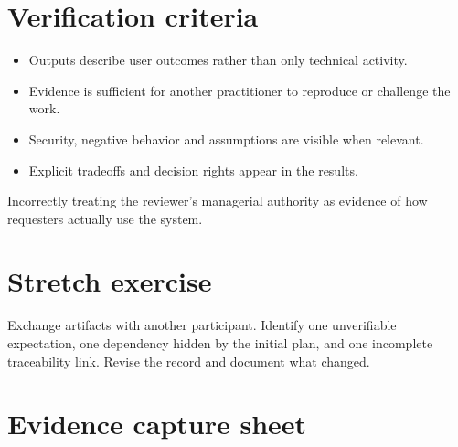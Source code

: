 \documentclass[11pt,letterpaper]{article}
\begin{document}
\section{Verification criteria}
\begin{itemize}[leftmargin=*,itemsep=2pt]
\item Outputs describe user outcomes rather than only technical activity.
\item Evidence is sufficient for another practitioner to reproduce or challenge the work.
\item Security, negative behavior and assumptions are visible when relevant.
\item Explicit tradeoffs and decision rights appear in the results.
\end{itemize}
\begin{tcolorbox}[colback=amberback,colframe=navy,title={Instructor note / expected reasoning},breakable]
Incorrectly treating the reviewer’s managerial authority as evidence of how requesters actually use the system.

\end{tcolorbox}
\section{Stretch exercise}
Exchange artifacts with another participant. Identify one unverifiable expectation, one dependency hidden by the initial plan, and one incomplete traceability link. Revise the record and document what changed.

\section{Evidence capture sheet}
\end{document}
